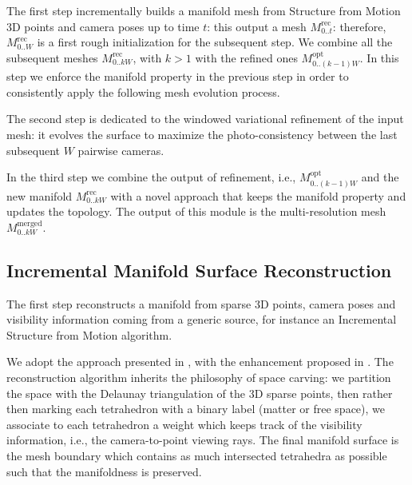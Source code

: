 The first step  incrementally builds a manifold mesh  from Structure from Motion 3D points and camera poses up to time $t$: this output a mesh $\mathit{M}_{0..t}^{\text{rec}}$: therefore,  $\mathit{M}_{0..W}^{\text{rec}}$ is a first rough initialization for the subsequent step. We combine all the subsequent meshes $\mathit{M}_{0..kW}^{\text{rec}}$, with $k>1$ with the refined ones $\mathit{M}_{0..(k-1)W}^{\text{opt}}$. 
In this step we enforce the manifold property in the previous step in order to consistently apply the following mesh evolution process.

The second step is dedicated to the windowed variational refinement of the input mesh: it evolves the surface to maximize the photo-consistency between the last subsequent $W$ pairwise cameras. 

In the third step we combine the output of refinement, i.e.,   $\mathit{M}_{0..(k-1)W}^{\text{opt}}$  and the new manifold $\mathit{M}_{0..kW}^{\text{rec}}$ with a novel approach that keeps the manifold property and updates the topology. 
The output of this module is the multi-resolution mesh $\mathit{M}_{0..kW}^{\text{merged}}$.



\subsection{Incremental Manifold Surface Reconstruction}
\label{sec:incremental_manifold}
The first step reconstructs a manifold from sparse 3D points, camera poses and visibility information coming from a generic source, for instance an Incremental Structure from Motion algorithm. 

We adopt the approach presented in \cite{litvinov_lhuillier_13}, with the enhancement proposed in \cite{romanoni15a}. The reconstruction algorithm inherits the philosophy of space carving: we partition the space with the Delaunay triangulation of the 3D sparse points, then rather then marking each tetrahedron with a binary label (matter or free space), we associate  to each tetrahedron a weight which keeps track of the visibility information, i.e., the camera-to-point viewing rays. The final manifold surface is the mesh boundary which contains as much intersected tetrahedra as possible such that the manifoldness is preserved.

